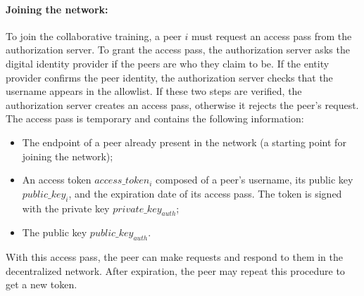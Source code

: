 \paragraph{Joining the network:} To join the collaborative training, a peer $i$ must request an access pass from the authorization server. To grant the access pass, the authorization server asks the digital identity provider if the peers are who they claim to be. If the entity provider confirms the peer identity, the authorization server checks that the username appears in the allowlist. If these two steps are verified, the authorization server creates an access pass, otherwise it rejects the peer's request. The access pass is temporary and contains the following information:
\begin{itemize}[leftmargin=*]
    \item The endpoint of a peer already present in the network (a starting point for joining the network);
    \item An access token $access\_token_{i}$ composed of a peer's username, its public key $public\_key_{i}$, and the expiration date of its access pass. The token is signed with the private key $private\_key_{auth}$;
    \item The public key $public\_key_{auth}$.
\end{itemize}
With this access pass, the peer can make requests and respond to them in the decentralized network. After expiration, the peer may repeat this procedure to get a new token.
